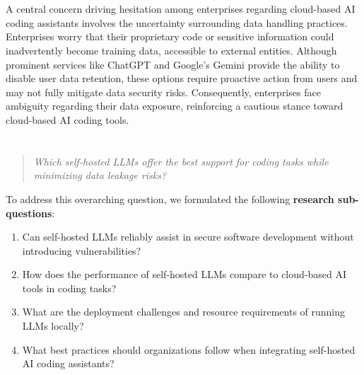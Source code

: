 \section{}%
\label{sec:probleemstelling}

A central concern driving hesitation among enterprises regarding cloud-based \gls{AI} coding assistants involves the uncertainty surrounding data handling practices. Enterprises worry that their proprietary code or sensitive information could inadvertently become training data, accessible to external entities. Although prominent services like ChatGPT and Google's Gemini provide the ability to disable user data retention, these options require proactive action from users and may not fully mitigate data security risks. Consequently, enterprises face ambiguity regarding their data exposure, reinforcing a cautious stance toward cloud-based \gls{AI} coding tools.

\section{}%
\label{sec:onderzoeksvraag}

\begin{quote}
	\textit{Which self-hosted \glspl{LLM} offer the best support for coding tasks while minimizing data leakage risks?}
\end{quote}
\label{rq:main}

To address this overarching question, we formulated the following \textbf{research sub-questions}:

\begin{enumerate}[label=SQ\arabic*., ref=SQ\arabic*]
	\item \label{sq:secure-dev} Can self-hosted \glspl{LLM} reliably assist in secure software development without introducing vulnerabilities?
	\item \label{sq:performance} How does the performance of self-hosted \glspl{LLM} compare to cloud-based \gls{AI} tools in coding tasks?
	\item \label{sq:deployment} What are the deployment challenges and resource requirements of running \glspl{LLM} locally?
	\item \label{sq:best-practices} What best practices should organizations follow when integrating self-hosted \gls{AI} coding assistants?
\end{enumerate}

